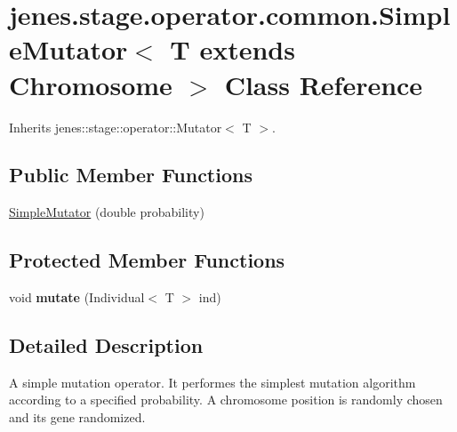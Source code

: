 \hypertarget{classjenes_1_1stage_1_1operator_1_1common_1_1_simple_mutator_3_01_t_01extends_01_chromosome_01_4}{
\section{jenes.stage.operator.common.SimpleMutator$<$ T extends Chromosome $>$ Class Reference}
\label{classjenes_1_1stage_1_1operator_1_1common_1_1_simple_mutator_3_01_t_01extends_01_chromosome_01_4}
}
Inherits jenes::stage::operator::Mutator$<$ T $>$.

\subsection*{Public Member Functions}
\begin{CompactItemize}
\item 
\hyperlink{classjenes_1_1stage_1_1operator_1_1common_1_1_simple_mutator_3_01_t_01extends_01_chromosome_01_4_5872d2360575c78f7b010aaee5ba5b30}{SimpleMutator} (double probability)
\end{CompactItemize}
\subsection*{Protected Member Functions}
\begin{CompactItemize}
\item 
\hypertarget{classjenes_1_1stage_1_1operator_1_1common_1_1_simple_mutator_3_01_t_01extends_01_chromosome_01_4_f54219113222ec25ff39116d3925cc4d}{
void \textbf{mutate} (Individual$<$ T $>$ ind)}
\label{classjenes_1_1stage_1_1operator_1_1common_1_1_simple_mutator_3_01_t_01extends_01_chromosome_01_4_f54219113222ec25ff39116d3925cc4d}

\end{CompactItemize}


\subsection{Detailed Description}
A simple mutation operator. It performes the simplest mutation algorithm according to a specified probability. A chromosome position is randomly chosen and its gene randomized. 

